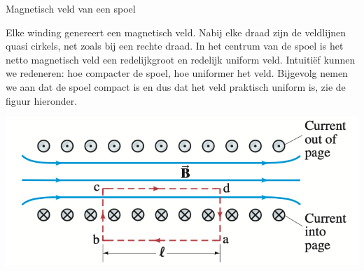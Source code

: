 \begin{app}{Magnetisch veld van een spoel}


    \noindent Elke winding genereert een magnetisch veld. Nabij elke draad zijn de veldlijnen quasi cirkels, net zoals bij een rechte draad. 
    In het centrum van de spoel is het netto magnetisch veld een redelijkgroot en redelijk uniform veld. Intuitiëf kunnen we redeneren: hoe compacter de spoel, hoe uniformer het veld. 
    Bijgevolg nemen we aan dat de spoel compact is en dus dat het veld praktisch uniform is, zie de figuur hieronder.

    \begin{center}
        \hspace*{1cm}\includegraphics[scale = 0.3]{Images/Magnetisme/SpoelMagnetischVeld}
    \end{center}


\end{app}

